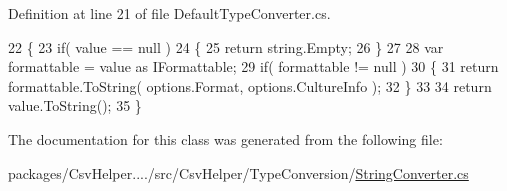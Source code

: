 Definition at line 21 of file Default\-Type\-Converter.\-cs.


\begin{DoxyCode}
22         \{
23             \textcolor{keywordflow}{if}( value == null )
24             \{
25                 \textcolor{keywordflow}{return} string.Empty;
26             \}
27 
28             var formattable = value as IFormattable;
29             \textcolor{keywordflow}{if}( formattable != null )
30             \{
31                 \textcolor{keywordflow}{return} formattable.ToString( options.Format, options.CultureInfo );
32             \}
33 
34             \textcolor{keywordflow}{return} value.ToString();
35         \}
\end{DoxyCode}


The documentation for this class was generated from the following file\-:\begin{DoxyCompactItemize}
\item 
packages/\-Csv\-Helper..../src/\-Csv\-Helper/\-Type\-Conversion/\hyperlink{a00256}{String\-Converter.\-cs}\end{DoxyCompactItemize}
